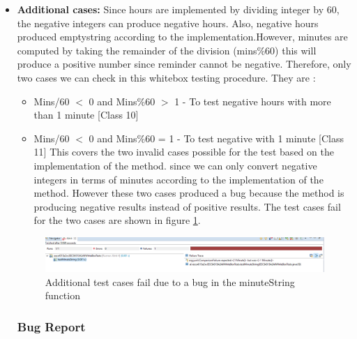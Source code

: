 \documentclass[fontsize=12pt,paper=letter,twoside]{scrartcl}
\begin{document}
\begin{itemize}
\item \textbf{Additional cases:} Since hours are implemented by dividing integer by 60, the negative integers can produce negative hours. Also, negative hours produced emptystring according to the implementation.However, minutes are computed by taking the remainder of the division (mins\%60) this will produce a positive number since reminder cannot be negative. Therefore, only two cases we can check in this whitebox testing procedure. They are :
\newpage
 \begin{itemize}
\item Mins/60 $<$ 0 and Mins\%60 $>$ 1 - To test negative hours with more than 1 minute [Class 10]
\item Mins/60 $<$ 0 and Mins\%60 = 1 -  To test negative with 1 minute [Class 11]
This covers the two invalid cases possible for the test based on the implementation of the method. since we can only convert negative integers in terms of minutes according to the implementation of the method. However these two cases produced a bug because the method is producing negative results instead of positive results. The test cases fail for the two cases are shown in figure \ref{fig:wbt_ect_bug}.
 \end{itemize}

\begin{figure}[!htb]
\begin{center}
\includegraphics[width=.99\textwidth]{images/wbt/ect/bug.png}
\end{center}
\caption{Additional test cases fail due to a bug in the minuteString function}
\label{fig:wbt_ect_bug}
\end{figure}



\subsubsection{Bug Report}


\end{itemize}
\end{document}
